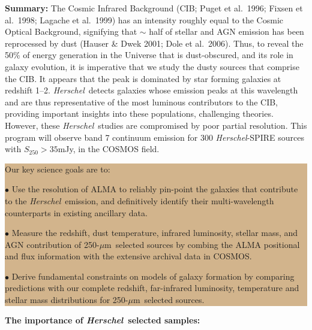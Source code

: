 \documentclass[12pt,a4paper]{article}
\newcommand{\herschel}{{\it Herschel}}
\newcommand{\ea}{et~al.}
\newcommand{\micron}{$\mu$m}
\begin{document}
{\bf Summary: }
%
The Cosmic Infrared Background (CIB; Puget et al.\ 1996; Fixsen et
al.\ 1998; Lagache et al.\ 1999) has an intensity roughly equal to the
Cosmic Optical Background, signifying that $\sim$ half of stellar
and AGN emission has been
reprocessed by dust (Hauser \& Dwek 2001; Dole et al.\ 2006). Thus, to
reveal the 50\% of energy generation in the Universe that is dust-obscured, and
its role in galaxy evolution, it is imperative that we study the dusty
sources that comprise the CIB. It appears that the peak is dominated by star forming galaxies at redshift 1--2. \herschel\ detects galaxies whose emission peaks at this wavelength and are thus representative of the most luminous contributors to the CIB, providing important insights into these populations, challenging theories. However, these \herschel\ studies are compromised by poor partial resolution.  
%
This program will observe band 7 continuum
emission for 300 \herschel-SPIRE sources with $S_{250}>35$mJy, in the COSMOS field.
\indent\indent\colorbox{tan}{
\begin{minipage}{16cm}
\noindent Our key science goals are to:

$\bullet$ Use the resolution of ALMA to reliably pin-point the galaxies
that contribute to the \herschel\ emission, and definitively identify
their multi-wavelength counterparts in existing ancillary data.


$\bullet$ Measure the redshift, dust temperature, infrared luminosity,
stellar mass, and AGN contribution of 250-\micron\
selected sources by combing the ALMA positional and flux information
with the extensive archival data in COSMOS.

$\bullet$ Derive fundamental constraints on models of galaxy formation
by comparing predictions with our complete redshift, far-infrared
luminosity, temperature and stellar mass distributions for
250-\micron\ selected sources.

\end{minipage}}

{\bf The importance of \herschel\ selected samples: }
%
\end{document}
